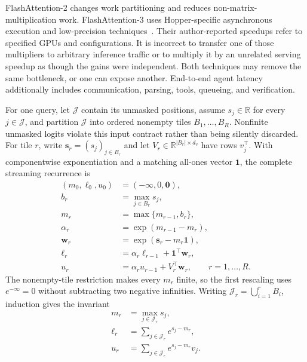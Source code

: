 FlashAttention-2 changes work partitioning and reduces non-matrix-multiplication work. FlashAttention-3 uses Hopper-specific asynchronous execution and low-precision techniques~\cite{dao2023flashattention2,shah2024flashattention3}. Their author-reported speedups refer to specified GPUs and configurations. It is incorrect to transfer one of those multipliers to arbitrary inference traffic or to multiply it by an unrelated serving speedup as though the gains were independent. Both techniques may remove the same bottleneck, or one can expose another. End-to-end agent latency additionally includes communication, parsing, tools, queueing, and verification.

For one query, let $\mathcal J$ contain its unmasked positions, assume $s_j\in\mathbb R$ for every $j\in\mathcal J$, and partition $\mathcal J$ into ordered nonempty tiles $B_1,\ldots,B_R$. Nonfinite unmasked logits violate this input contract rather than being silently discarded. For tile $r$, write $\mathbf s_r=(s_j)_{j\in B_r}$ and let $V_r\in\mathbb R^{|B_r|\times d_v}$ have rows $v_j^\top$. With componentwise exponentiation and a matching all-ones vector $\mathbf1$, the complete streaming recurrence is
\begin{equation}
\label{eq:C04:streaming}
\begin{aligned}
 (m_0,\ell_0,u_0)&=(-\infty,0,\mathbf0),\\
 b_r&=\max_{j\in B_r}s_j,\\
 m_r&=\max\{m_{r-1},b_r\},\\
 \alpha_r&=\exp(m_{r-1}-m_r),\\
 \mathbf w_r&=\exp(\mathbf s_r-m_r\mathbf1),\\
 \ell_r&=\alpha_r\ell_{r-1}+\mathbf1^\top\mathbf w_r,\\
 u_r&=\alpha_r u_{r-1}+V_r^\top\mathbf w_r,
 \qquad r=1,\ldots,R.
\end{aligned}
\end{equation}
The nonempty-tile restriction makes every $m_r$ finite, so the first rescaling uses $e^{-\infty}=0$ without subtracting two negative infinities. Writing $\mathcal J_r=\bigcup_{i=1}^rB_i$, induction gives the invariant
\begin{equation}
\label{eq:C04:streaming-invariant}
\begin{aligned}
 m_r&=\max_{j\in\mathcal J_r}s_j,\\
 \ell_r&=\sum_{j\in\mathcal J_r}e^{s_j-m_r},\\
 u_r&=\sum_{j\in\mathcal J_r}e^{s_j-m_r}v_j.
\end{aligned}
\end{equation}
